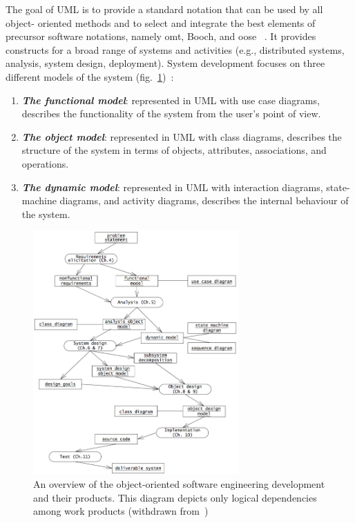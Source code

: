 The goal of UML is to provide a standard notation that can be used by all
object- oriented methods and to select and integrate the best elements of
precursor software notations, namely \gls{omt}, Booch, and \gls{oose}
~\cite{bruegge2004object}. It provides
constructs for a broad range of systems and activities (e.g., distributed
systems, analysis, system design, deployment). System development focuses on
three different models of the system
(fig.~\ref{fig:sw-devel-activities})~\cite{bruegge2004object}:
\begin{enumerate}
  \item \textbf{\emph{The functional model}}: represented in UML with use case
    diagrams, describes the functionality of the system from the user's point of
    view.
  \item \textbf{\emph{The object model}}: represented in UML with class
    diagrams, describes the structure of the system in terms of objects,
    attributes, associations, and operations.  
  \item \textbf{\emph{The dynamic model}}: represented in UML with interaction
    diagrams, state-machine diagrams, and activity diagrams, describes the
    internal behaviour of the system.
\end{enumerate}

\begin{figure}[!hbt]
\centering
    \includegraphics[width=0.7\textwidth]{./img/sw-devel-activities.png}
  \caption{An overview of the object-oriented software engineering development
  and their products. This diagram depicts only logical dependencies among work
  products (withdrawn from~\cite{bruegge2004object})}
\label{fig:sw-devel-activities}
\end{figure}


